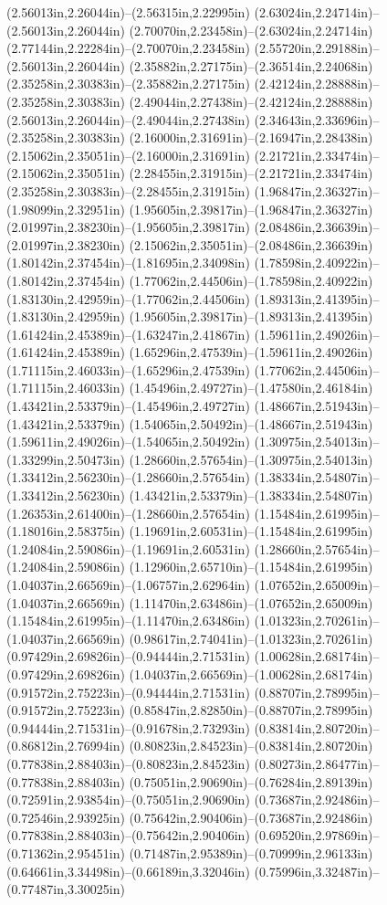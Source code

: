 (2.56013in,2.26044in)--(2.56315in,2.22995in) (2.63024in,2.24714in)--(2.56013in,2.26044in) (2.70070in,2.23458in)--(2.63024in,2.24714in) (2.77144in,2.22284in)--(2.70070in,2.23458in) (2.55720in,2.29188in)--(2.56013in,2.26044in) (2.35882in,2.27175in)--(2.36514in,2.24068in) (2.35258in,2.30383in)--(2.35882in,2.27175in) (2.42124in,2.28888in)--(2.35258in,2.30383in) (2.49044in,2.27438in)--(2.42124in,2.28888in) (2.56013in,2.26044in)--(2.49044in,2.27438in) (2.34643in,2.33696in)--(2.35258in,2.30383in) (2.16000in,2.31691in)--(2.16947in,2.28438in) (2.15062in,2.35051in)--(2.16000in,2.31691in) (2.21721in,2.33474in)--(2.15062in,2.35051in) (2.28455in,2.31915in)--(2.21721in,2.33474in) (2.35258in,2.30383in)--(2.28455in,2.31915in) (1.96847in,2.36327in)--(1.98099in,2.32951in) (1.95605in,2.39817in)--(1.96847in,2.36327in) (2.01997in,2.38230in)--(1.95605in,2.39817in) (2.08486in,2.36639in)--(2.01997in,2.38230in) (2.15062in,2.35051in)--(2.08486in,2.36639in) (1.80142in,2.37454in)--(1.81695in,2.34098in) (1.78598in,2.40922in)--(1.80142in,2.37454in) (1.77062in,2.44506in)--(1.78598in,2.40922in) (1.83130in,2.42959in)--(1.77062in,2.44506in) (1.89313in,2.41395in)--(1.83130in,2.42959in) (1.95605in,2.39817in)--(1.89313in,2.41395in) (1.61424in,2.45389in)--(1.63247in,2.41867in) (1.59611in,2.49026in)--(1.61424in,2.45389in) (1.65296in,2.47539in)--(1.59611in,2.49026in) (1.71115in,2.46033in)--(1.65296in,2.47539in) (1.77062in,2.44506in)--(1.71115in,2.46033in) (1.45496in,2.49727in)--(1.47580in,2.46184in) (1.43421in,2.53379in)--(1.45496in,2.49727in) (1.48667in,2.51943in)--(1.43421in,2.53379in) (1.54065in,2.50492in)--(1.48667in,2.51943in) (1.59611in,2.49026in)--(1.54065in,2.50492in) (1.30975in,2.54013in)--(1.33299in,2.50473in) (1.28660in,2.57654in)--(1.30975in,2.54013in) (1.33412in,2.56230in)--(1.28660in,2.57654in) (1.38334in,2.54807in)--(1.33412in,2.56230in) (1.43421in,2.53379in)--(1.38334in,2.54807in) (1.26353in,2.61400in)--(1.28660in,2.57654in) (1.15484in,2.61995in)--(1.18016in,2.58375in) (1.19691in,2.60531in)--(1.15484in,2.61995in) (1.24084in,2.59086in)--(1.19691in,2.60531in) (1.28660in,2.57654in)--(1.24084in,2.59086in) (1.12960in,2.65710in)--(1.15484in,2.61995in) (1.04037in,2.66569in)--(1.06757in,2.62964in) (1.07652in,2.65009in)--(1.04037in,2.66569in) (1.11470in,2.63486in)--(1.07652in,2.65009in) (1.15484in,2.61995in)--(1.11470in,2.63486in) (1.01323in,2.70261in)--(1.04037in,2.66569in) (0.98617in,2.74041in)--(1.01323in,2.70261in) (0.97429in,2.69826in)--(0.94444in,2.71531in) (1.00628in,2.68174in)--(0.97429in,2.69826in) (1.04037in,2.66569in)--(1.00628in,2.68174in) (0.91572in,2.75223in)--(0.94444in,2.71531in) (0.88707in,2.78995in)--(0.91572in,2.75223in) (0.85847in,2.82850in)--(0.88707in,2.78995in) (0.94444in,2.71531in)--(0.91678in,2.73293in) (0.83814in,2.80720in)--(0.86812in,2.76994in) (0.80823in,2.84523in)--(0.83814in,2.80720in) (0.77838in,2.88403in)--(0.80823in,2.84523in) (0.80273in,2.86477in)--(0.77838in,2.88403in) (0.75051in,2.90690in)--(0.76284in,2.89139in) (0.72591in,2.93854in)--(0.75051in,2.90690in) (0.73687in,2.92486in)--(0.72546in,2.93925in) (0.75642in,2.90406in)--(0.73687in,2.92486in) (0.77838in,2.88403in)--(0.75642in,2.90406in) (0.69520in,2.97869in)--(0.71362in,2.95451in) (0.71487in,2.95389in)--(0.70999in,2.96133in) (0.64661in,3.34498in)--(0.66189in,3.32046in) (0.75996in,3.32487in)--(0.77487in,3.30025in) 
